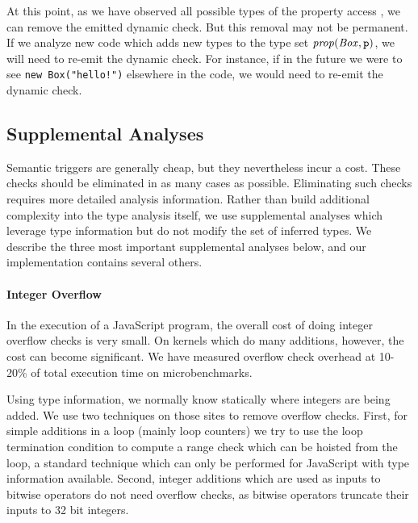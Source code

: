 At this point, as we have observed all possible types of the property access
, we can remove the emitted dynamic check. But this removal may
not be permanent. If we analyze new code which adds new types to the type set
$\mathit{prop}(\mathit{Box}, \texttt{p})$, we will need to re-emit the dynamic
check. For instance, if in the future we were to see \lstinline{new Box("hello!")}
elsewhere in the code, we would need to re-emit the dynamic check.

\subsection{Supplemental Analyses}
\label{sec:supplemental-analyses}

Semantic triggers are generally cheap, but they nevertheless incur a cost.
These checks should be eliminated in as many cases as possible.
Eliminating such checks requires more detailed analysis information.
Rather than build additional complexity into the type analysis itself,
we use supplemental analyses which leverage type information but do not
modify the set of inferred types.
We describe the three most important supplemental analyses below, and
our implementation contains several others.

\paragraph{Integer Overflow}

In the execution of a JavaScript program, the overall cost of doing integer
overflow checks is very small.
On kernels which do many additions, however, the cost can become significant.
We have measured overflow check overhead at 10-20\% of total execution
time on microbenchmarks.

Using type information, we normally know statically where integers are being
added. We use two techniques on those sites to remove overflow checks.
First, for simple additions in a loop (mainly loop counters) we try to use
the loop termination condition to compute a range
check which can be hoisted from the loop, a standard technique
which can only be performed for JavaScript with type information available.
Second, integer additions which are used as inputs to bitwise operators
do not need overflow checks, as bitwise operators truncate their inputs to 32
bit integers.


